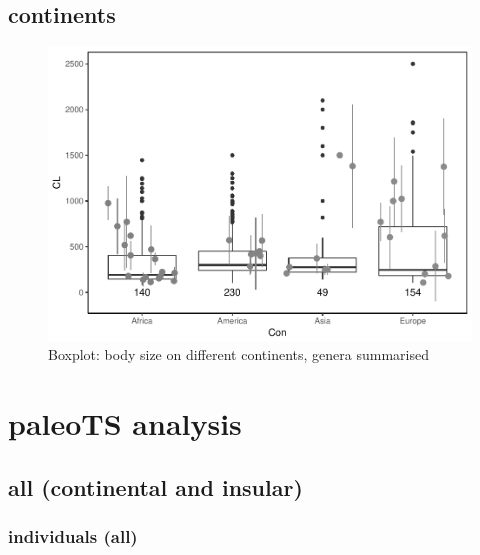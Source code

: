 \documentclass[]{article}
\begin{document}
\newpage

\subsection{continents}\label{continents-1}

\begin{figure}[htbp]
\centering
\includegraphics{MA_JJ_files/figure-latex/Boxplot body size split into continents-1.pdf}
\caption{Boxplot: body size on different continents, genera summarised}
\end{figure}

\newpage

\section{paleoTS analysis}\label{paleots-analysis}

\subsection{all (continental and
insular)}\label{all-continental-and-insular}

\subsubsection{individuals (all)}\label{individuals-all}
\end{document}
